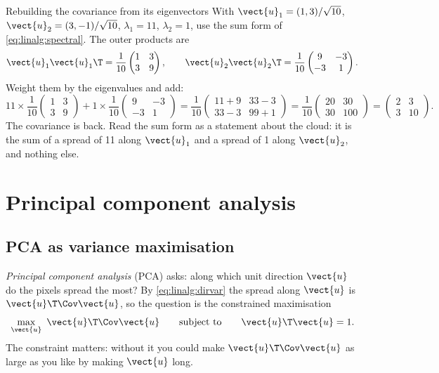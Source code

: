 \begin{worked}[label={we:linalg:spectral}]{Rebuilding the covariance from its eigenvectors}
With $\vect{u}_1 = (1, 3)/\sqrt{10}$, $\vect{u}_2 = (3, -1)/\sqrt{10}$, $\lambda_1 = 11$,
$\lambda_2 = 1$, use the sum form of \cref{eq:linalg:spectral}. The outer products are
\[
\vect{u}_1\vect{u}_1\T = \frac{1}{10}\begin{pmatrix} 1 & 3\\ 3 & 9\end{pmatrix},
\qquad
\vect{u}_2\vect{u}_2\T = \frac{1}{10}\begin{pmatrix} 9 & -3\\ -3 & 1\end{pmatrix}.
\]
Weight them by the eigenvalues and add:
\[
11\times\frac{1}{10}\begin{pmatrix} 1 & 3\\ 3 & 9\end{pmatrix}
+ 1\times\frac{1}{10}\begin{pmatrix} 9 & -3\\ -3 & 1\end{pmatrix}
= \frac{1}{10}\begin{pmatrix} 11 + 9 & 33 - 3\\ 33 - 3 & 99 + 1\end{pmatrix}
= \frac{1}{10}\begin{pmatrix} 20 & 30\\ 30 & 100\end{pmatrix}
= \begin{pmatrix} 2 & 3\\ 3 & 10\end{pmatrix}.
\]
The covariance is back. Read the sum form as a statement about the cloud: it is the sum of a
spread of 11 along $\vect{u}_1$ and a spread of 1 along $\vect{u}_2$, and nothing else.
\end{worked}

\section{Principal component analysis}\label{sec:linalg:pca}

\subsection{PCA as variance maximisation}

\emph{Principal component analysis} (PCA) asks: along which
unit direction $\vect{u}$ do the pixels spread the most? By \cref{eq:linalg:dirvar} the spread
along $\vect{u}$ is $\vect{u}\T\Cov\vect{u}$, so the question is the constrained maximisation
\begin{equation}\label{eq:linalg:pcaproblem}
\max_{\vect{u}}\ \vect{u}\T\Cov\vect{u}
\qquad\text{subject to}\qquad \vect{u}\T\vect{u} = 1 .
\end{equation}
The constraint matters: without it you could make $\vect{u}\T\Cov\vect{u}$ as large as you like by
making $\vect{u}$ long.

